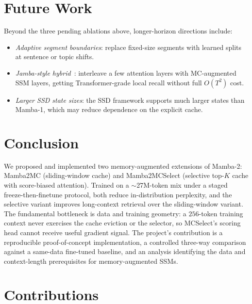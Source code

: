 \documentclass{article}
\begin{document}
\section{Future Work}

Beyond the three pending ablations above, longer-horizon directions include:
\begin{itemize}
    \itemsep0pt
    \item \emph{Adaptive segment boundaries}: replace fixed-size segments with learned splits at sentence or topic shifts.
    \item \emph{Jamba-style hybrid}~\citep{lieber2024jambahybridtransformermambalanguage}: interleave a few attention layers with MC-augmented SSM layers, getting Transformer-grade local recall without full $O(T^2)$ cost.
    \item \emph{Larger SSD state sizes}: the SSD framework supports much larger states than Mamba-1, which may reduce dependence on the explicit cache.
\end{itemize}

\section{Conclusion}

We proposed and implemented two memory-augmented extensions of Mamba-2: Mamba2MC (sliding-window cache) and Mamba2MCSelect (selective top-$K$ cache with score-biased attention). Trained on a $\sim$27M-token mix under a staged freeze-then-finetune protocol, both reduce in-distribution perplexity, and the selective variant improves long-context retrieval over the sliding-window variant. The fundamental bottleneck is data and training geometry: a $256$-token training context never exercises the cache eviction or the selector, so MCSelect's scoring head cannot receive useful gradient signal. The project's contribution is a reproducible proof-of-concept implementation, a controlled three-way comparison against a same-data fine-tuned baseline, and an analysis identifying the data and context-length prerequisites for memory-augmented SSMs.

\section{Contributions}
\end{document}
